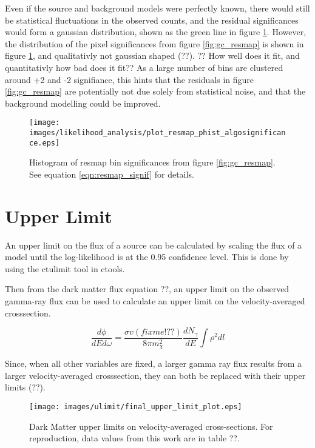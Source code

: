   Even if the source and background models were perfectly known, there would still be statistical fluctuations in the observed counts, and the residual significances would form a gaussian distribution, shown as the green line in figure \ref{fig:gc_resmap_sighist}.
  However, the distribution of the pixel significances from figure \ref{fig:gc_resmap} is shown in figure \ref{fig:gc_resmap_sighist}, and qualitativly not gaussian shaped (??).
  ?? How well does it fit, and quantitativly how bad does it fit??
  As a large number of bins are clustered around +2 and -2 signifiance, this hints that the residuals in figure \ref{fig:gc_resmap} are potentially not due solely from statistical noise, and that the background modelling could be improved.
  
  \begin{figure}[ht]
    \centering
    \texttt{[image: images/likelihood\_analysis/plot\_resmap\_phist\_algosignificance.eps]}
    \caption[Galactic Center Residual Histogram]
    {
      Histogram of resmap bin significances from figure \ref{fig:gc_resmap}.
      See equation \ref{eqn:resmap_signif} for details.
    }
    \label{fig:gc_resmap_sighist}
  \end{figure}
  
  
\section{Upper Limit}
  An upper limit on the flux of a source can be calculated by scaling the flux of a model until the log-likelihood is at the 0.95 confidence level.
  This is done by using the ctulimit tool in ctools.
  
  Then from the dark matter flux equation ??, an upper limit on the observed gamma-ray flux can be used to calculate an upper limit on the velocity-averaged crosssection.
  
  \begin{equation}\label{eqn:ulim}
    \frac{d\phi}{dE d\omega} = \frac{ \sigma v (fixme!??)}{8\pi m_{\chi}^{2}} \frac{dN_{\gamma}}{dE} \int \rho^{2} dl
  \end{equation}
  
  Since, when all other variables are fixed, a larger gamma ray flux results from a larger velocity-averaged crosssection, they can both be replaced with their upper limits (??).

  \begin{figure}[ht]
    \begin{center}
      \texttt{[image: images/ulimit/final\_upper\_limit\_plot.eps]}
      \caption[Dark Matter Upper Limit Plot]
      {
        Dark Matter upper limits on velocity-averaged cross-sections.
        For reproduction, data values from this work are in table ??.
      }
      \label{fig:ulim}
    \end{center}
  \end{figure}
  
  
